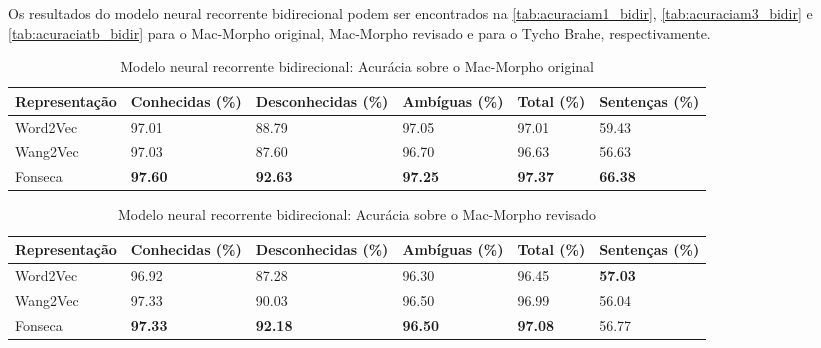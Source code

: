 Os resultados do modelo neural recorrente bidirecional podem ser encontrados na \autoref{tab:acuraciam1_bidir}, \autoref{tab:acuraciam3_bidir} e \autoref{tab:acuraciatb_bidir} para o Mac-Morpho original, Mac-Morpho revisado e para o Tycho Brahe, respectivamente.

\begin{table}[!htb]
\footnotesize
\centering
\caption{Modelo neural recorrente bidirecional: Acurácia sobre o Mac-Morpho original}
\label{tab:acuraciam1_bidir}
\begin{tabular}{m{2.5cm}P{2.2cm}P{2.2cm}P{2.2cm}P{2.2cm}P{2.2cm}}
  \toprule
  \textbf{Representação} & \textbf{Conhecidas (\%)}  & \textbf{Desconhecidas (\%)} & \textbf{Ambíguas (\%)} & \textbf{Total (\%)} & \textbf{Sentenças (\%)} \\
  \midrule
  Word2Vec  & 97.01 & 88.79 & 97.05 & 97.01 & 59.43  \\ %
  Wang2Vec  & 97.03 & 87.60 & 96.70 & 96.63 & 56.63  \\ %
  Fonseca 	& \textbf{97.60} & \textbf{92.63} & \textbf{97.25} & \textbf{97.37} & \textbf{66.38}	 \\ %
  \bottomrule
\end{tabular}
\end{table}


\begin{table}[!htb]
\footnotesize
\centering
\caption{Modelo neural recorrente bidirecional: Acurácia sobre o Mac-Morpho revisado}
\label{tab:acuraciam3_bidir}
\begin{tabular}{m{2.5cm}P{2.2cm}P{2.2cm}P{2.2cm}P{2.2cm}P{2.2cm}}
  \toprule
  \textbf{Representação} & \textbf{Conhecidas (\%)}  & \textbf{Desconhecidas (\%)} & \textbf{Ambíguas (\%)} & \textbf{Total (\%)} & \textbf{Sentenças (\%)} \\
  \midrule
  Word2Vec  & 96.92 & 87.28 & 96.30 & 96.45 & \textbf{57.03} \\ %
  Wang2Vec  & 97.33 & 90.03 & 96.50 & 96.99 & 56.04 \\ %
  Fonseca  	& \textbf{97.33} & \textbf{92.18} & \textbf{96.50} & \textbf{97.08} & 56.77 \\ %
  \bottomrule
\end{tabular}
\end{table}



